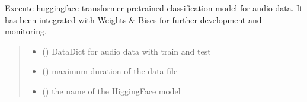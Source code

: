 \documentclass[letterpaper,10pt,english]{sphinxmanual}
\begin{document}
\begin{fulllineitems}
\begin{fulllineitems}
\label{\detokenize{BeeClassification:BeeClassification.BeeClassification.transformer_classification}}
\pysigstartsignatures
{}
\pysigstopsignatures
\sphinxAtStartPar
Execute huggingface transformer pre\sphinxhyphen{}trained classification model for audio data. It has been integrated with Weights \& Bises for further development and monitoring.
\begin{quote}\begin{description}
\begin{itemize}
\item {} 
\sphinxAtStartPar
{} () \textendash{} DataDict for audio data with train and test

\item {} 
\sphinxAtStartPar
{} () \textendash{} maximum duration of the data file

\item {} 
\sphinxAtStartPar
{} () \textendash{} the name of the HiggingFace model


\end{itemize}
\end{description}
\end{quote}
\end{fulllineitems}
\end{fulllineitems}
\end{document}

